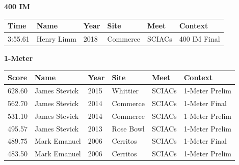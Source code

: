 \vspace{1.2em}
\noindent\begin{minipage}[t]{0.98\textwidth}
\centering
\textbf{\textcolor{teamprimary}{400 IM}}\par
\vspace{0.5em}
\centering
\small
\renewcommand{\arraystretch}{1.0}
\setlength{\tabcolsep}{4pt}
\begin{tabular}{@{}p{2.0cm}p{3.2cm}p{1.2cm}p{2.0cm}p{2.0cm}p{2.5cm}@{}}
\toprule
\textbf{Time} & \textbf{Name} & \textbf{Year} & \textbf{Site} & \textbf{Meet} & \textbf{Context} \\
\midrule
3:55.61 & Henry Limm & 2018 & Commerce & SCIACs & 400 IM Final \\
\bottomrule
\end{tabular}
\end{minipage}
\vspace{1.2em}
\noindent\begin{minipage}[t]{0.98\textwidth}
\centering
\textbf{\textcolor{teamprimary}{1-Meter}}\par
\vspace{0.5em}
\centering
\small
\renewcommand{\arraystretch}{1.0}
\setlength{\tabcolsep}{4pt}
\begin{tabular}{@{}p{2.0cm}p{3.2cm}p{1.2cm}p{2.0cm}p{2.0cm}p{2.5cm}@{}}
\toprule
\textbf{Score} & \textbf{Name} & \textbf{Year} & \textbf{Site} & \textbf{Meet} & \textbf{Context} \\
\midrule
628.60 & James Stevick & 2015 & Whittier & SCIACs & 1-Meter Prelim \\
562.70 & James Stevick & 2014 & Commerce & SCIACs & 1-Meter Final \\
531.10 & James Stevick & 2014 & Commerce & SCIACs & 1-Meter Prelim \\
495.57 & James Stevick & 2013 & Rose Bowl & SCIACs & 1-Meter Prelim \\
489.75 & Mark Emanuel & 2006 & Cerritos & SCIACs & 1-Meter Final \\
483.50 & Mark Emanuel & 2006 & Cerritos & SCIACs & 1-Meter Prelim \\
\bottomrule
\end{tabular}
\end{minipage}
\vspace{1.2em}
